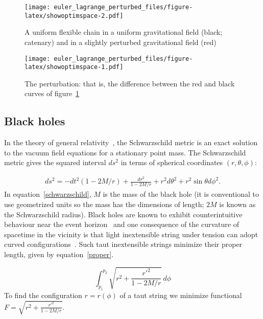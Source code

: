 \documentclass[pdflatex,sn-mathphys-num]{sn-jnl}%
\theoremstyle{thmstyleone}%
\theoremstyle{thmstyletwo}%
\theoremstyle{thmstylethree}%
\begin{document}
\begin{figure}[h]
\centering %
\texttt{[image: euler\_lagrange\_perturbed\_files/figure-latex/showoptimspace-2.pdf]}
\caption{A uniform flexible chain in a uniform gravitational field
  (black; catenary) and in a slightly perturbed gravitational field (red)}
\label{trop_perturb}
\end{figure}

\begin{figure}[h]
\centering %
\texttt{[image: euler\_lagrange\_perturbed\_files/figure-latex/showoptimspace-1.pdf]}
\caption{The perturbation: that is, the difference between the red and
  black curves of figure~\ref{trop_perturb}}
\label{trop}
\end{figure}

\subsection{Black holes}

In the theory of general relativity~\cite{misner1973}, the
Schwarzschild metric is an exact solution to the vacuum field
equations for a stationary point mass.  The Schwarzschild metric gives
the squared interval $ds^2$ in terms of spherical coordinates
$(r,\theta,\phi)$:

\begin{eqnarray}\label{schwarzschild}
  ds^2=
  -dt^2(1-2M/r) + \frac{dr^2}{1-2M/r} + r^2d\theta^2 + r^2\sin\theta d\phi^2.
\end{eqnarray}
%
In equation~\ref{schwarzschild}, $M$ is the mass of the black hole (it
is conventional to use geometrized units so the mass has the
dimensions of length; $2M$ is known as the Schwarzschild radius).
Black holes are known to exhibit counterintuitive behaviour near the
event horizon~\cite{allen1990} and one consequence of the curvature of
spacetime in the vicinity is that light inextensible string under
tension can adopt curved configurations~\cite{hankin2021}.  Such taut
inextensible strings minimize their proper length, given by
equation~\ref{proper}.

\begin{equation}\label{proper}
  \int_{p_1}^{p_2}\sqrt{r^2 + \frac{r'^2}{1-2M/r}}\,d\phi
\end{equation}
%
To find the configuration $r=r(\phi)$ of a taut string we minimize
functional $F=\sqrt{r^2 + \frac{r'^2}{1-2M/r}}$.
\end{document}
